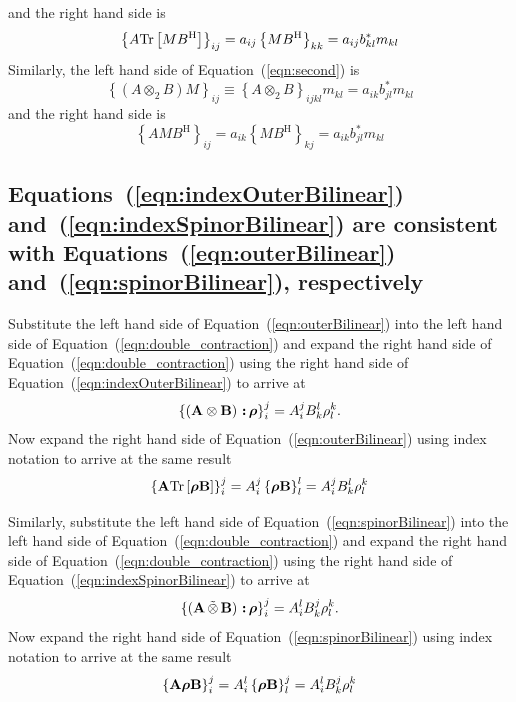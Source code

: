 \documentclass[twocolumn]{aastex6}
\newcommand{\mbf}[1]{\mbox{\boldmath $#1$}}
\newcommand{\Eqn}[1]{Equation~(\ref{eqn:#1})}
\newcommand{\Eqns}[3]{Equations~(\ref{eqn:#1}) #2~(\ref{eqn:#3})}
\newcommand{\trace}{{\rm Tr}}
\newcommand{\tr}[1]{\trace\ensuremath{ \left[ {#1} \right] }}
\newcommand{\outerBilinear}[2]{\ensuremath{{#1}\otimes{#2}}}
\newcommand{\stimes}{\ensuremath{\tilde{\otimes}}}
\newcommand{\spinorBilinear}[2]{\ensuremath{{#1}\,\stimes\,{#2}}}
\begin{document}
{\begin{appendix}
\begin{equation}
\end{equation}
and the right hand side is
\begin{equation}
\left\{ A \tr{ M B^\mathrm{H} } \right\}_{ij}
  = a_{ij} \left\{ M B^\mathrm{H} \right\}_{kk} = a_{ij} b^*_{kl} m_{kl}
\end{equation}
%
Similarly, the left hand side of \Eqn{second} is
\begin{equation}
\left\{  \left( A\otimes_2B \right) M \right\}_{ij}
  \equiv \left\{ A\otimes_2B \right\}_{ijkl} m_{kl} = a_{ik} b^*_{jl} m_{kl}
\end{equation}
and the right hand side is
\begin{equation}
\left\{ A M B^\mathrm{H} \right\}_{ij}
  = a_{ik} \left\{ M B^\mathrm{H} \right\}_{kj} = a_{ik} b^*_{jl} m_{kl}
\end{equation}

%
%
\hrulefill
\subsection{\Eqns{indexOuterBilinear}{and}{indexSpinorBilinear}
  are consistent with \Eqns{outerBilinear}{and}{spinorBilinear},
  respectively}
\label{sec:eq15to18}

\noindent
Substitute the left hand side of \Eqn{outerBilinear} into the left
hand side of \Eqn{double_contraction} and expand the right hand side
of \Eqn{double_contraction} using the right hand side of
\Eqn{indexOuterBilinear} to arrive at
%
\begin{equation}
\left\{ \left( \outerBilinear{\bf A}{\bf B} \right) \,\mbf{:}\, \mbf{\rho} \right\}_i^j
  = A_i^j B_k^l \rho_l^k.
\end{equation}
%
Now expand the right hand side of \Eqn{outerBilinear} using
index notation to arrive at the same result
\begin{equation}
\left\{ {\bf A}\tr{\mbf{\rho}{\bf B}} \right\}_i^j
  = A_i^j \left\{ \mbf{\rho}{\bf B} \right\}_l^l
  = A_i^j B_k^l \rho_l^k
\end{equation}

Similarly, substitute the left hand side of \Eqn{spinorBilinear} into the left hand side
of \Eqn{double_contraction} and expand the right hand side of \Eqn{double_contraction} using
the right hand side of \Eqn{indexSpinorBilinear} to arrive at
%
\begin{equation}
\left\{ \left( \spinorBilinear{\bf A}{\bf B} \right) \,\mbf{:}\, \mbf{\rho} \right\}_i^j
  = A_i^l B_k^j \rho_l^k.
\end{equation}
%
Now expand the right hand side of \Eqn{spinorBilinear} using index notation to
arrive at the same result
\begin{equation}
\left\{ {\bf A}\mbf{\rho}{\bf B} \right\}_i^j
  = A_i^l \left\{ \mbf{\rho}{\bf B} \right\}_l^j
  = A_i^l B_k^j \rho_l^k
\end{equation}


\end{appendix}}
\end{document}

